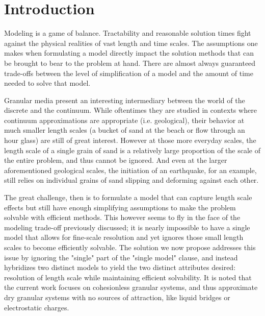 \chapter{Introduction}

Modeling is a game of balance. Tractability and reasonable solution times fight against the physical realities of vast length and time scales. The assumptions one makes when formulating a model directly impact the solution methods that can be brought to bear to the problem at hand. There are almost always guaranteed trade-offs between the level of simplification of a model and the amount of time needed to solve that model.

Granular media present an interesting intermediary between the world of the discrete and the continuum. While oftentimes they are studied in contexts where continuum approximations are appropriate (i.e. geological), their behavior at much smaller length scales (a bucket of sand at the beach or flow through an hour glass) are still of great interest. However at those more everyday scales, the length scale of a single grain of sand is a relatively large proportion of the scale of the entire problem, and thus cannot be ignored. And even at the larger aforementioned geological scales, the initiation of an earthquake, for an example, still relies on individual grains of sand slipping and deforming against each other.

The great challenge, then is to formulate a model that can capture length scale effects but still have enough simplifying assumptions to make the problem solvable with efficient methods. This however seems to fly in the face of the modeling trade-off previously discussed; it is nearly impossible to have a single model that allows for fine-scale resolution and yet ignores those small length scales to become efficiently solvable. The solution we now propose addresses this issue by ignoring the "single" part of the "single model" clause, and instead hybridizes two distinct models to yield the two distinct attributes desired: resolution of length scale while maintaining efficient solvability. It is noted that the current work focuses on cohesionless granular systems, and thus approximate dry granular systems with no sources of attraction, like liquid bridges or electrostatic charges.

